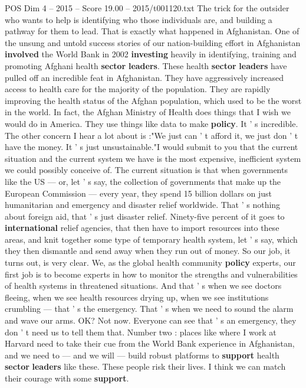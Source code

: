 \begin{textsample}{POS Dim 4 – 2015 – Score 19.00 – 2015/t001120.txt}
The trick for the outsider who wants to help is identifying who those individuals are, and building a pathway for them to lead.
That is exactly what happened in Afghanistan.
One of the unsung and untold success stories of our nation-building effort in Afghanistan \textbf{involved} the World Bank in 2002 \textbf{investing} heavily in identifying, training and promoting Afghani health \textbf{sector} \textbf{leaders}.
These health \textbf{sector} \textbf{leaders} have pulled off an incredible feat in Afghanistan.
They have aggressively increased access to health care for the majority of the population.
They are rapidly improving the health status of the Afghan population, which used to be the worst in the world.
In fact, the Afghan Ministry of Health does things that I wish we would do in America.
They use things like data to make \textbf{policy}.
It ' s incredible.
The other concern I hear a lot about is :"We just can ' t afford it, we just don ' t have the money.
It ' s just unsustainable."I would submit to you that the current situation and the current system we have is the most expensive, inefficient system we could possibly conceive of.
The current situation is that when governments like the US — or, let ' s say, the collection of governments that make up the European Commission — every year, they spend 15 billion dollars on just humanitarian and emergency and disaster relief worldwide.
That ' s nothing about foreign aid, that ' s just disaster relief.
Ninety-five percent of it goes to \textbf{international} relief agencies, that then have to import resources into these areas, and knit together some type of temporary health system, let ' s say, which they then dismantle and send away when they run out of money.
So our job, it turns out, is very clear.
We, as the global health community \textbf{policy} experts, our first job is to become experts in how to monitor the strengths and vulnerabilities of health systems in threatened situations.
And that ' s when we see doctors fleeing, when we see health resources drying up, when we see institutions crumbling — that ' s the emergency.
That ' s when we need to sound the alarm and wave our arms.
OK?
Not now.
Everyone can see that ' s an emergency, they don ' t need us to tell them that.
Number two : places like where I work at Harvard need to take their cue from the World Bank experience in Afghanistan, and we need to — and we will — build robust platforms to \textbf{support} health \textbf{sector} \textbf{leaders} like these.
These people risk their lives.
I think we can match their courage with some \textbf{support}.

\end{textsample}
